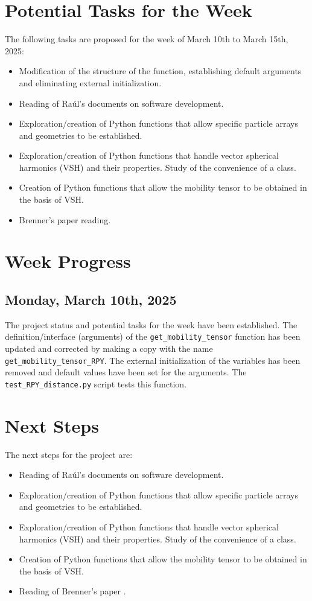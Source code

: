 \documentclass[12pt]{article}
\begin{document}
\section{Potential Tasks for the Week}
The following tasks are proposed for the week of March 10th to March 15th, 2025:
\begin{itemize}
    \item Modification of the structure of the  function, establishing default arguments and eliminating external initialization.
    \item Reading of Raúl's documents on software development.
    \item Exploration/creation of Python functions that allow specific particle arrays and geometries to be established.
    \item Exploration/creation of Python functions that handle vector spherical harmonics (VSH) and their properties. Study of the convenience of a class.
    \item Creation of Python functions that allow the mobility tensor to be obtained in the basis of VSH.
    \item Brenner's paper \cite{BRENNER1961242} reading.
\end{itemize}

\section{Week Progress}

\subsection{Monday, March 10th, 2025}
The project status and potential tasks for the week have been established.
The definition/interface (arguments) of the
\texttt{get\_mobility\_tensor} function has been updated
and corrected by making a copy with the name
\texttt{get\_mobility\_tensor\_RPY}. The external initialization
of the variables has been removed and default values have been
set for the arguments. The \texttt{test\_RPY\_distance.py}
script tests this function.

\section{Next Steps}
The next steps for the project are:
\begin{itemize}
    \item Reading of Raúl's documents on software development.
    \item Exploration/creation of Python functions that allow specific particle arrays and geometries to be established.
    \item Exploration/creation of Python functions that handle vector spherical harmonics (VSH) and their properties. Study of the convenience of a class.
    \item Creation of Python functions that allow the mobility tensor to be obtained in the basis of VSH.
    \item Reading of Brenner's paper \cite{BRENNER1961242}.
\end{itemize}

\printbibliography
\end{document}
